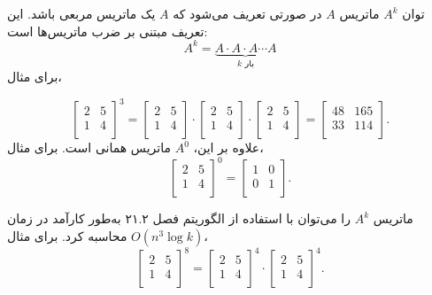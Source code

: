 
توان $A^k$ ماتریس $A$ در صورتی تعریف می‌شود
که $A$ یک ماتریس مربعی باشد.
این تعریف مبتنی بر ضرب ماتریس‌ها است:
\[ A^k = \underbrace{A \cdot A \cdot A \cdots A}_{\textrm{$k$ بار}} \]
برای مثال،

\[
 \begin{bmatrix}
  2 & 5 \\
  1 & 4 \\
 \end{bmatrix}^3 =
 \begin{bmatrix}
  2 & 5 \\
  1 & 4 \\
 \end{bmatrix} \cdot
 \begin{bmatrix}
  2 & 5 \\
  1 & 4 \\
 \end{bmatrix} \cdot
 \begin{bmatrix}
  2 & 5 \\
  1 & 4 \\
 \end{bmatrix} =
 \begin{bmatrix}
  48 & 165 \\
  33 & 114 \\
 \end{bmatrix}.
\]
علاوه بر این، $A^0$ ماتریس همانی است. برای مثال،
\[
 \begin{bmatrix}
  2 & 5 \\
  1 & 4 \\
 \end{bmatrix}^0 =
 \begin{bmatrix}
  1 & 0 \\
  0 & 1 \\
 \end{bmatrix}.
\]

ماتریس $A^k$ را می‌توان با استفاده از الگوریتم فصل ۲۱.۲
به‌طور کارآمد در زمان $O(n^3 \log k)$ محاسبه کرد. برای مثال،
\[
 \begin{bmatrix}
  2 & 5 \\
  1 & 4 \\
 \end{bmatrix}^8 =
 \begin{bmatrix}
  2 & 5 \\
  1 & 4 \\
 \end{bmatrix}^4 \cdot
 \begin{bmatrix}
  2 & 5 \\
  1 & 4 \\
 \end{bmatrix}^4.
\]

